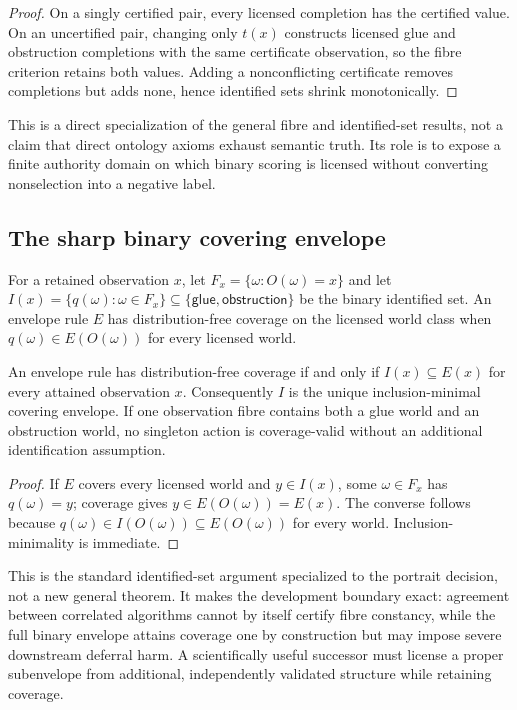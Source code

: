 \begin{proof}
On a singly certified pair, every licensed completion has the certified value.
On an uncertified pair, changing only $t(x)$ constructs licensed glue and
obstruction completions with the same certificate observation, so the fibre
criterion retains both values. Adding a nonconflicting certificate removes
completions but adds none, hence identified sets shrink monotonically.
\end{proof}

This is a direct specialization of the general fibre and identified-set
results, not a claim that direct ontology axioms exhaust semantic truth. Its
role is to expose a finite authority domain on which binary scoring is licensed
without converting nonselection into a negative label.

\subsection{The sharp binary covering envelope}

For a retained observation $x$, let
$F_x=\{\omega:O(\omega)=x\}$ and let
$I(x)=\{q(\omega):\omega\in F_x\}\subseteq
\{\mathsf{glue},\mathsf{obstruction}\}$ be the binary identified set. An
envelope rule $E$ has distribution-free coverage on the licensed world class
when $q(\omega)\in E(O(\omega))$ for every licensed world.

\begin{corollary}
\label{cor:binary-covering-envelope}
An envelope rule has distribution-free coverage if and only if
$I(x)\subseteq E(x)$ for every attained observation $x$. Consequently $I$ is
the unique inclusion-minimal covering envelope. If one observation fibre
contains both a glue world and an obstruction world, no singleton action is
coverage-valid without an additional identification assumption.
\end{corollary}

\begin{proof}
If $E$ covers every licensed world and $y\in I(x)$, some
$\omega\in F_x$ has $q(\omega)=y$; coverage gives
$y\in E(O(\omega))=E(x)$. The converse follows because
$q(\omega)\in I(O(\omega))\subseteq E(O(\omega))$ for every world.
Inclusion-minimality is immediate.
\end{proof}

This is the standard identified-set argument specialized to the portrait
decision, not a new general theorem. It makes the development boundary exact:
agreement between correlated algorithms cannot by itself certify fibre
constancy, while the full binary envelope attains coverage one by construction
but may impose severe downstream deferral harm. A scientifically useful
successor must license a proper subenvelope from additional, independently
validated structure while retaining coverage.

